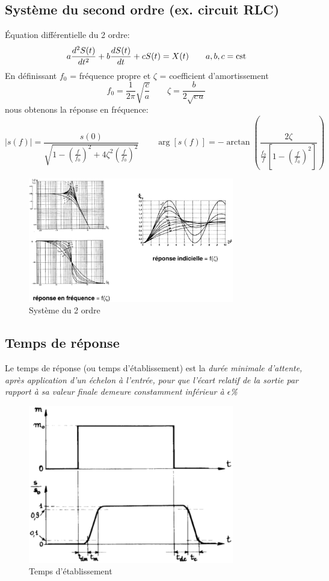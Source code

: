 \subsection{Système du second ordre (ex. circuit RLC)}
Équation différentielle du 2 ordre:
\[
a\frac{d^2 S(t)}{dt^2} + b \frac{d S(t)}{dt} + cS(t) = X(t)\qquad a,b,c=\text{cst}
\]
En définissant \(f_0\) = fréquence propre et \(\zeta\) = coefficient d'amortissement
\[
f_0 = \frac{1}{2\pi}\sqrt{\frac{c}{a}}\qquad \zeta=\frac{b}{2\sqrt{c\,a}}
\]
nous obtenons la réponse en fréquence:
\[
|s(f)|=\frac{s(0)}{\sqrt{1-\left(\frac{f}{f_0}\right)^2+4\zeta^2\left(\frac{f}{f_0}\right)^2}}\qquad \arg[s(f)] = -\arctan\left(\frac{2\zeta}{\frac{f_0}{f}\left[1-\left(\frac{f}{f_0}\right)^2\right]}\right)
\]

\begin{figure}[H] 
	\centering 
	\includegraphics[width=0.8\textwidth]{ch2/image11} 
	\caption{Système du 2 ordre} 
\end{figure}
\subsection{Temps de réponse}
Le temps de réponse (ou temps d'établissement) est la \emph{durée minimale d'attente, après application d'un échelon à l'entrée, pour que l'écart relatif de la sortie par rapport à sa valeur finale demeure constamment inférieur à \(\epsilon\)\%}
\begin{figure}[H] 
	\centering 
	\includegraphics[width=0.8\textwidth,height=10\baselineskip,keepaspectratio]{ch2/image12} 
	\caption{Temps d'établissement} 
	\label{fig:tempsétabliss}
\end{figure}
